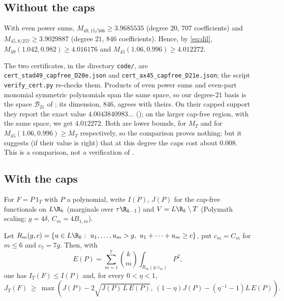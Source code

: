 \subsection*{Without the caps}
\begin{proposition}\label{prop:capfree}
With even power sums,
$M_{49,15/506}\ge3.9685535$ (degree $20$, $707$ coefficients) and
$M_{45,8/257}\ge3.9029887$ (degree $21$, $846$ coefficients). Hence, by
\eqref{eq:dil}, $M_{49}(1.042,0.982)\ge4.016176$ and
$M_{45}(1.06,0.996)\ge4.012272$.
\end{proposition}

\begin{sloppypar}
The two certificates, in the directory \texttt{code/}, are
\texttt{cert\_stad49\_capfree\_D20e.json} and
\texttt{cert\_ax45\_capfree\_D21e.json}; the script
\texttt{verify\_cert.py} re-checks them. Products of even power sums and
even-part monomial symmetric polynomials span the same space, so our degree-$21$
basis is the space $\mathcal B_{21}$ of \cite[Thm.~11.1]{Cha26}; its dimension,
$846$, agrees with theirs. On their capped support they report the exact value
$4.0043840983\ldots$ (); on the larger cap-free region, with the
same space, we get $4.012272$. Both are lower bounds, for $M_T$ and for
$M_{45}(1.06,0.996)\ge M_T$ respectively, so the comparison proves nothing;
but it suggests (if their value is right) that at this degree the caps cost
about $0.008$. This is a comparison, not a verification of \cite{Cha26}.
\end{sloppypar}

\subsection*{With the caps}
For $F=P\,1_T$ with $P$ a polynomial, write $I(P)$, $J(P)$ for the cap-free
functionals on $L\R_k$ (marginals over $\tau\R_{k-1}$) and $V=L\R_k\setminus T$
(Polymath scaling; $g=4\delta$, $C_m=4B_{1,m}$).

\begin{proposition}\label{prop:caps}
Let $R_m(g,c)=\{u\in L\R_k:\ u_1,\dots,u_m>g,\ u_1+\dots+u_m\ge c\}$, put
$c_m=C_m$ for $m\le6$ and $c_7=7g$. Then, with
\[
E(P)=\sum_{m=1}^{7}\binom km\int_{R_m(g,c_m)}P^2 ,
\]
one has $I_T(F)\le I(P)$ and, for every $0<\eta<1$,
\[
J_T(F)\ \ge\ \max\left(J(P)-2\sqrt{J(P)\,L\,E(P)},\ (1-\eta)J(P)-(\eta^{-1}-1)L\,E(P)\right).
\]
\end{proposition}

